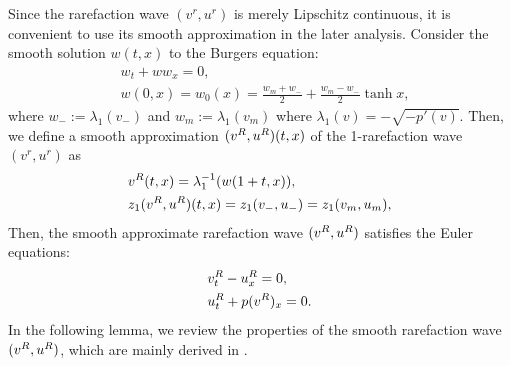 \documentclass[11pt,reqno]{amsart}
\begin{document}
    Since the rarefaction wave $(v^r,u^r)$ is merely Lipschitz continuous, it is convenient to use its smooth approximation in the later analysis. Consider the smooth solution $w(t,x)$ to the Burgers equation:
    \begin{equation*} %
        \begin{aligned}
            &w_t+w w_x=0,\\
            &w(0,x)=w_0(x)=\frac{w_m+w_-}{2}+\frac{w_m-w_-}{2}\tanh x,
        \end{aligned}
    \end{equation*}
    where $w_-:=\lambda_1(v_-)$ and $w_m:=\lambda_1(v_m)$ where $\lambda_1(v)=-\sqrt{-p'(v)}$. Then, we define a smooth approximation $(v^R,u^R)(t,x)$ of the 1-rarefaction wave $(v^r,u^r)$ as
    \begin{equation*} %
        \begin{aligned}
            &\vr(t,x)=\lambda_1^{-1}(w(1+t,x)),\\
            &z_1(\vr,\ur)(t,x)=z_1(v_-,u_-)=z_1(v_m,u_m),
        \end{aligned}
    \end{equation*}
    Then, the smooth approximate rarefaction wave $(v^R, u^R)$ satisfies the Euler equations:
    \begin{equation*} %
        \begin{aligned}
        &v^R_t-u^R_x=0, \\
        &u^R_t+p(\vr)_x=0.
        \end{aligned}
    \end{equation*}
    In the following lemma, we review the properties of the smooth rarefaction wave $(v^R,u^R)$, which are mainly derived in \cite{MN86}.
    
\end{document}

